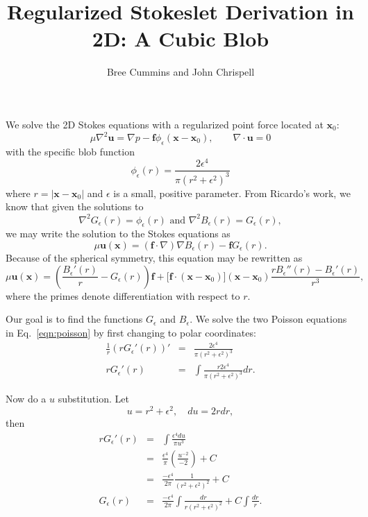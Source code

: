 \documentclass[12pt]{article}
\title{Regularized Stokeslet Derivation in 2D: A Cubic Blob}
\author{Bree Cummins and John Chrispell}
\newcommand{\bee}[1]{\begin{equation} #1 \end{equation}}
\newcommand{\bees}[1]{\begin{equation*} #1 \end{equation*}}
\newcommand{\baas}[1]{\begin{eqnarray*} #1 \end{eqnarray*}}
\newcommand{\bx}{{\mathbf x}}
\newcommand{\bu}{{\mathbf u}}
\newcommand{\ff}{{\mathbf f}}
\newcommand{\pe}{\phi_\epsilon}
\newcommand{\Ge}{G_\epsilon}
\newcommand{\Be}{B_\epsilon}
\newcommand{\eps}{\epsilon}
\begin{document}
\maketitle

We solve the 2D Stokes equations with a regularized point force located at $\bx_0$:
\bees{
\mu\nabla^2 \bu = \nabla p - \ff \pe(\bx - \bx_0), \qquad \nabla \cdot \bu = 0
}
with the specific blob function 
\bees{
\pe(r) = \frac{2\eps^4}{\pi(r^2 + \eps^2)^3}
}
where $r = |\bx - \bx_0|$ and $\eps$ is a small, positive parameter. From Ricardo's work, we know that given the solutions to 
\bee{
\nabla^2 \Ge(r) = \pe(r) \text{ and } \nabla^2 \Be(r) = \Ge(r), \label{eqn:poisson}
}
we may write the solution to the Stokes equations as 
\bees{
\mu\bu(\bx) = \left(\ff \cdot \nabla \right)\nabla \Be(r) - \ff\Ge(r).
}
Because of the spherical symmetry, this equation may be rewritten as 
\bee{
\mu\bu(\bx) = \left( \frac{\Be'(r)}{r} - \Ge(r)\right)\ff + \big[\ff \cdot (\bx -\bx_0)\big](\bx -\bx_0)\frac{r\Be''(r) - \Be'(r)}{r^3}, \label{eqn:usoln}
}
where the primes denote differentiation with respect to $r$.

Our goal is to find the functions $\Ge$ and $\Be$. We solve the two Poisson equations in Eq.~\eqref{eqn:poisson} by first changing to polar coordinates:
\baas{
\frac{1}{r}\left( r \Ge'(r) \right)' &=& \frac{2\eps^4}{\pi(r^2 + \eps^2)^3} \\
r \Ge'(r) &=& \int \frac{r 2\eps^4}{\pi(r^2 + \eps^2)^3} dr.
}
\pagebreak 

Now do a $u$ substitution. Let
\bee{
u = r^2 + \eps^2, \quad du = 2r dr, \label{eqn:usub}
}
then
\baas{
r \Ge'(r) &=& \int \frac{\eps^4 du}{\pi u^3} \\
&=& \frac{\eps^4}{\pi} \left(\frac{u^{-2}}{-2} \right) + C\\
&=& \frac{-\eps^4}{2\pi} \frac{1}{(r^2 + \eps^2)^2} + C \\
\Ge(r) &=& \frac{-\eps^4}{2\pi} \int \frac{dr}{r(r^2 + \eps^2)^2} + C \int \frac{dr}{r}.
}
\end{document}
